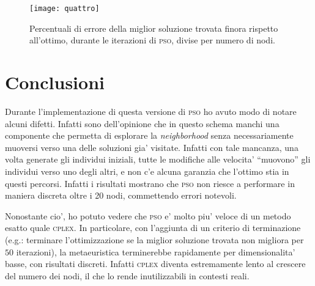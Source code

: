 \documentclass[
12pt, %
a4paper, %
oneside, %
headinclude,footinclude, %
BCOR5mm, %
]{scrartcl}
\begin{document}
\begin{figure}[H]
	\centering
	\texttt{[image: quattro]}
	\caption[]{Percentuali di errore della miglior soluzione trovata finora rispetto all'ottimo, durante le iterazioni di \textsc{pso}, divise per numero di nodi.}
	\label{fig:quattro}
\end{figure}

\section{Conclusioni}\label{sec:conclusioni}

Durante l'implementazione di questa versione di \textsc{pso} ho avuto modo di notare alcuni difetti. Infatti sono dell'opinione che in questo schema manchi una componente che permetta di esplorare la \textit{neighborhood} senza necessariamente muoversi verso una delle soluzioni gia' visitate. Infatti con tale mancanza, una volta generate gli individui iniziali, tutte le modifiche alle velocita' ``muovono'' gli individui verso uno degli altri, e non c'e alcuna garanzia che l'ottimo stia in questi percorsi. Infatti i risultati mostrano che \textsc{pso} non riesce a performare in maniera discreta oltre i 20 nodi, commettendo errori notevoli.
 
Nonostante cio', ho potuto vedere che \textsc{pso} e' molto piu' veloce di un metodo esatto quale \textsc{cplex}. In particolare, con l'aggiunta di un criterio di terminazione (e.g.: terminare l'ottimizzazione se la miglior soluzione trovata non migliora per $50$ iterazioni), la metaeuristica terminerebbe rapidamente per dimensionalita' basse, con risultati discreti. Infatti \textsc{cplex} diventa estremamente lento al crescere del numero dei nodi, il che lo rende inutilizzabili in contesti reali.

\renewcommand{\refname}{\spacedlowsmallcaps{References}} %




\end{document}
